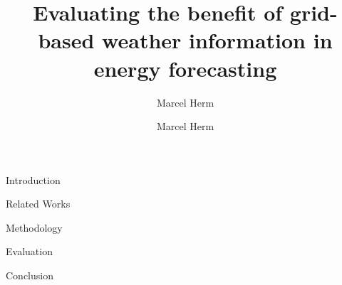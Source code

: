 \documentclass[t]{beamer}
\title{Evaluating the benefit of grid-based weather information in energy forecasting}
\subtitle{Marcel Herm}
\author{Marcel Herm}
\institute{INSTITUT FÜR AUTOMATION UND ANGEWANDTE INFORMATIK}
\begin{document}
\begin{frame}
  \maketitle
\end{frame}

  \makeatletter
  \makeatother

\removeKITFrame

\begin{frame}{Introduction}


\end{frame}

\begin{frame}{Related Works}


\end{frame}

\begin{frame}{Methodology}


\end{frame}

\begin{frame}{Evaluation}


\end{frame}

\begin{frame}{Conclusion}


\end{frame}
\end{document}
